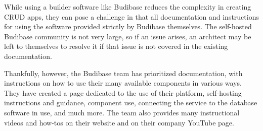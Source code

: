 \documentclass{article}
\begin{document}
While using a builder software like Budibase reduces the complexity in creating CRUD apps, they can pose a challenge in that all 
documentation and 
instructions for using the software provided strictly by Budibase themselves. The self-hosted Budibase community is not 
very large, so if an issue arises, an architect may be left to themselves to resolve it if that issue is not covered
in the existing documentation. 

Thankfully, however, the Budibase team has prioritized documentation, with instructions on how to use their many available 
components in various ways. They have created a page dedicated to the use of their platform, self-hosting instructions and guidance, 
component use, connecting the service to the database software in use, and much more. \cite{budibase-docs} The team also provides 
many instructional videos and how-tos on their website and on their company YouTube page. \cite{budibase-youtube}
\end{document}
